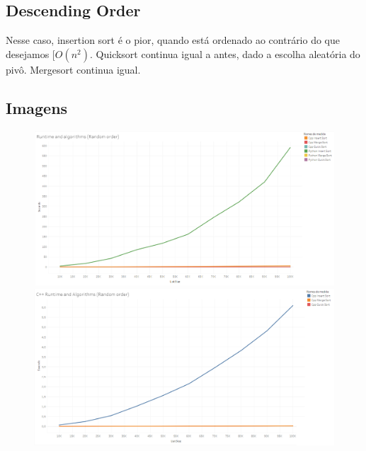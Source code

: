 \documentclass{article}
\begin{document}
\subsection{Descending Order}


Nesse caso, insertion sort é o pior, quando está ordenado ao contrário do que desejamos $[O(n^2)$. Quicksort continua igual a antes, dado a escolha aleatória do pivô. Mergesort continua igual.

\subsection{Imagens}
\begin{figure}[!h]
\centering
\includegraphics[scale=0.3]{images/runtime_ALL-random.png}
\includegraphics[scale=0.3]{images/runtime_cppONLY-random.png}
\end{figure}
\end{document}
